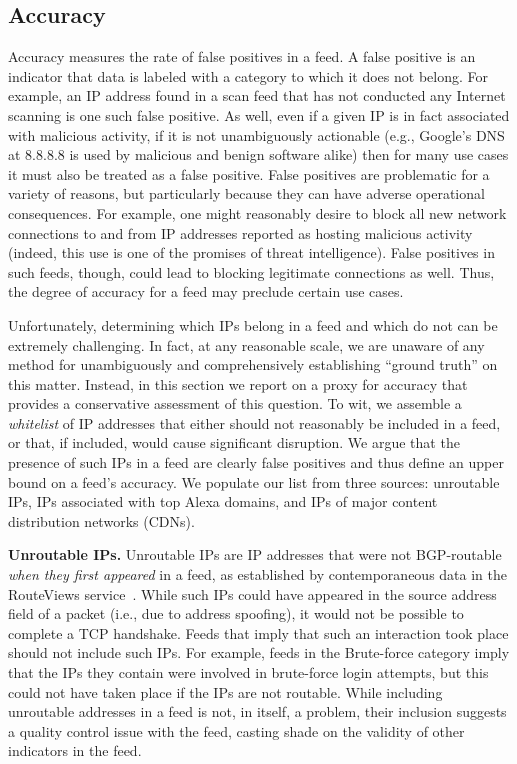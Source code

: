 \subsection{Accuracy}
\label{sec:ip-accuracy}


Accuracy measures the rate of false positives in a feed. A false
positive is an indicator that data is labeled with a category to which
it does not belong.  For example, an IP address found in a scan feed
that has not conducted any Internet scanning is one such false
positive.  As well, even if a given IP is in fact associated with
malicious activity, if it is not unambiguously actionable (e.g.,
Google's DNS at 8.8.8.8 is used by malicious and benign software
alike) then for many use cases it must also be treated as a false
positive.  False positives are problematic for a variety of reasons,
but particularly because they can have adverse operational
consequences.  For example, one might reasonably desire to block all
new network connections to and from IP addresses reported as hosting
malicious activity (indeed, this use is one of the promises of threat
intelligence). False positives in such feeds, though, could lead to
blocking legitimate connections as well.  Thus, the degree of accuracy
for a feed may preclude certain use cases.

Unfortunately, determining which IPs belong in a feed and which do not
can be extremely challenging. In fact, at any reasonable scale, we are
unaware of any method for unambiguously and comprehensively
establishing ``ground truth'' on this matter.  Instead, in this
section we report on a proxy for accuracy that provides a
conservative assessment of this question.  To wit, we assemble a
\emph{whitelist} of IP addresses that either should not reasonably be
included in a feed, or that, if included, would cause significant
disruption. We argue that the presence of such IPs in a feed are
clearly false positives and thus define an upper bound on a feed's
accuracy.  We populate our list from three sources: unroutable IPs,
IPs associated with top Alexa domains, and IPs of major content
distribution networks (CDNs).

\noindent\textbf{Unroutable IPs.} Unroutable IPs are IP addresses that
were not BGP-routable \emph{when they first appeared} in a feed, as
established by contemporaneous data in the RouteViews
service~\cite{Routeview}. While such IPs could have appeared in the
source address field of a packet (i.e., due to address spoofing), it
would not be possible to complete a TCP handshake. Feeds that imply
that such an interaction took place should not include such IPs. For
example, feeds in the Brute-force category imply that the IPs they
contain were involved in brute-force login attempts, but this could
not have taken place if the IPs are not routable. While including
unroutable addresses in a feed is not, in itself, a problem, their
inclusion suggests a quality control issue with the feed, casting
shade on the validity of other indicators in the feed.

